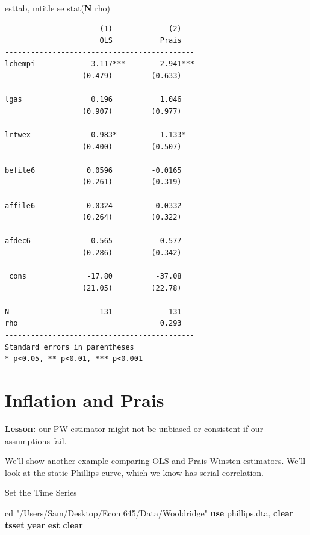 \documentclass[
]{book}
\newenvironment{Shaded}{\begin{snugshade}}{\end{snugshade}}
\newcommand{\FunctionTok}[1]{\textcolor[rgb]{0.13,0.29,0.53}{\textbf{#1}}}
\newcommand{\KeywordTok}[1]{\textcolor[rgb]{0.13,0.29,0.53}{\textbf{#1}}}
\newcommand{\NormalTok}[1]{#1}
\newcommand{\StringTok}[1]{\textcolor[rgb]{0.31,0.60,0.02}{#1}}
\begin{document}
\begin{Shaded}
\begin{Highlighting}[]
\NormalTok{    esttab, mtitle se stat(}\KeywordTok{N}\NormalTok{ rho)}
\end{Highlighting}
\end{Shaded}

\begin{verbatim}
                      (1)             (2)   
                      OLS           Prais   
--------------------------------------------
lchempi             3.117***        2.941***
                  (0.479)         (0.633)   

lgas                0.196           1.046   
                  (0.907)         (0.977)   

lrtwex              0.983*          1.133*  
                  (0.400)         (0.507)   

befile6            0.0596         -0.0165   
                  (0.261)         (0.319)   

affile6           -0.0324         -0.0332   
                  (0.264)         (0.322)   

afdec6             -0.565          -0.577   
                  (0.286)         (0.342)   

_cons              -17.80          -37.08   
                  (21.05)         (22.78)   
--------------------------------------------
N                     131             131   
rho                                 0.293   
--------------------------------------------
Standard errors in parentheses
* p<0.05, ** p<0.01, *** p<0.001
\end{verbatim}

\section{Inflation and Prais}\label{inflation-and-prais}

\textbf{Lesson:} our PW estimator might not be unbiased or consistent if our assumptions fail.

We'll show another example comparing OLS and Prais-Winsten estimators. We'll
look at the static Phillips curve, which we know has serial correlation.

Set the Time Series

\begin{Shaded}
\begin{Highlighting}[]
\NormalTok{cd }\StringTok{"/Users/Sam/Desktop/Econ 645/Data/Wooldridge"}
\KeywordTok{use}\NormalTok{ phillips.dta, }\KeywordTok{clear}
\KeywordTok{tsset} \FunctionTok{year}
\KeywordTok{est} \KeywordTok{clear}
\end{Highlighting}
\end{Shaded}
\end{document}
